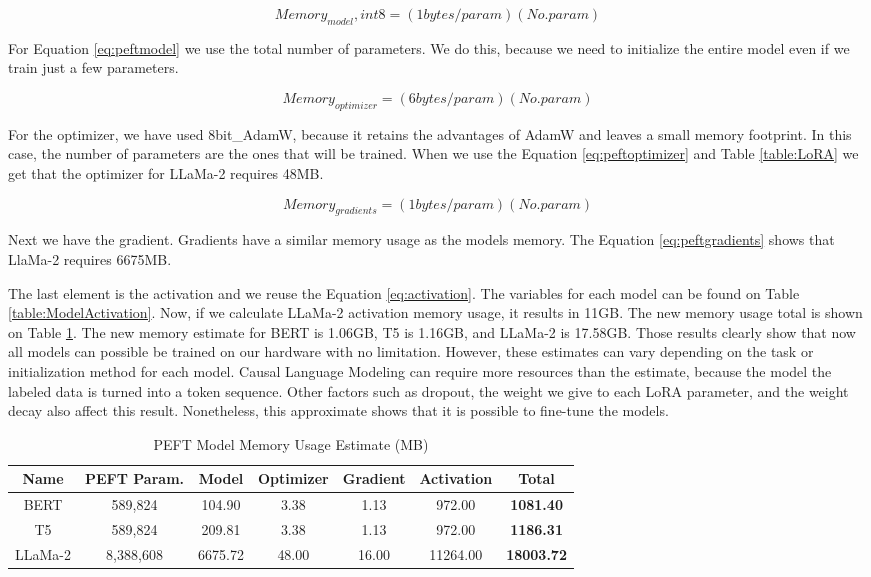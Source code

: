 \[ Memory_{model}, int8 = (1 bytes/param) (No. param) \label{eq:peftmodel} \tag{7} \] 

For Equation \ref{eq:peftmodel} we use the total number of parameters. We do this, because we need to initialize the entire model even if we train just a few parameters.

\[ Memory_{optimizer} = (6 bytes/param) (No. param) \label{eq:peftoptimizer} \tag{8} \] 

For the optimizer, we have used 8bit\_AdamW, because it retains the advantages of AdamW and leaves a small memory footprint. In this case, the number of parameters are the ones that
will be trained. When we use the Equation \ref{eq:peftoptimizer} and Table \ref{table:LoRA} we get that the optimizer for LLaMa-2 requires 48MB. 

\[ Memory_{gradients} = (1 bytes/param) (No. param) \label{eq:peftgradients} \tag{9} \] 

Next we have the gradient. Gradients have a similar memory usage as the models memory. The Equation \ref{eq:peftgradients} shows that LlaMa-2 requires 6675MB.

The last element is the activation and we reuse the Equation \ref{eq:activation}. The variables for each model can be found on Table \ref{table:ModelActivation}. Now,
if we calculate LLaMa-2 activation memory usage, it results in 11GB. The new memory usage total is shown on Table \ref{table:PeftMemoryUsage}. The new memory estimate
for BERT is 1.06GB, T5 is 1.16GB, and LLaMa-2 is 17.58GB. Those results clearly show that now all models can possible be trained on our hardware with no limitation. 
However, these estimates can vary depending on the task or initialization method for each model. Causal Language Modeling can require more resources than the estimate, because 
the model the labeled data is turned into a token sequence. Other factors such as dropout, the weight we give to each LoRA parameter, and the weight decay also affect this result.
Nonetheless, this approximate shows that it is possible to fine-tune the models.

\begin{table}[H]
	\centering
	\caption{PEFT Model Memory Usage Estimate (MB)}
	\begin{tabular}{||c | c | c | c | c | c | c||} 
		\hline
		\textbf{Name} & \textbf{PEFT Param.} & \textbf{Model} & \textbf{Optimizer} & \textbf{Gradient} & \textbf{Activation} & \textbf{Total} \\ [1ex] 
		\hline
		BERT & 589,824 & 104.90 & 3.38 & 1.13 & 972.00 & \textbf{1081.40} \\ [1ex]
		\hline
		T5 & 589,824 & 209.81 & 3.38 & 1.13 & 972.00 & \textbf{1186.31}  \\[1ex]
		\hline
		LLaMa-2 & 8,388,608 & 6675.72 & 48.00 & 16.00 & 11264.00 & \textbf{18003.72}  \\[1ex]
		\hline
	\end{tabular}
	\label{table:PeftMemoryUsage}
\end{table}



